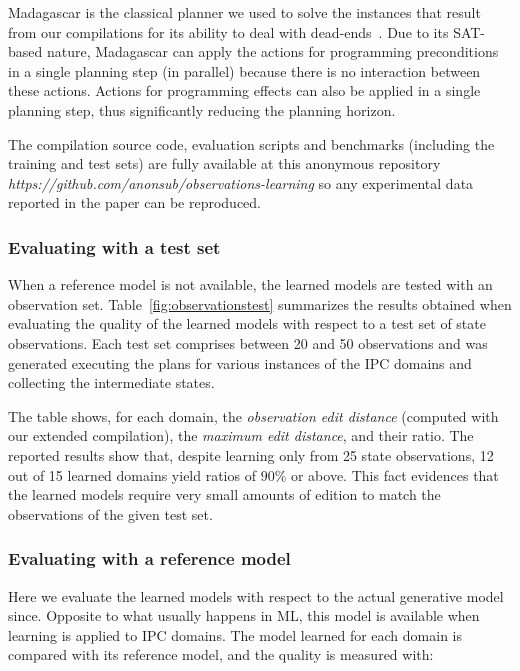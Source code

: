 \documentclass{article}
\begin{document}
{\sc Madagascar} is the classical planner we used to solve the instances that result from our compilations for its ability to deal with dead-ends~\cite{rintanen2014madagascar}. Due to its SAT-based nature, {\sc Madagascar} can apply the actions for programming preconditions in a single planning step (in parallel) because there is no interaction between these actions. Actions for programming effects can also be applied in a single planning step, thus significantly reducing the planning horizon.

The compilation source code, evaluation scripts and benchmarks (including the training and test sets) are fully available at this anonymous repository {\em https://github.com/anonsub/observations-learning} so any experimental data reported in the paper can be reproduced.


\subsubsection{Evaluating with a test set}

When a reference model is not available, the learned models are tested with an observation set. Table~\ref{fig:observationstest} summarizes the results obtained when evaluating the quality of the learned models with respect to a test set of state observations. Each test set comprises between 20 and 50 observations and was generated executing the plans for various instances of the IPC domains and collecting the intermediate states.

The table shows, for each domain, the {\em observation edit distance} (computed with our extended compilation), the {\em maximum edit distance}, and their ratio. The reported results show that, despite learning only from 25 state observations, 12 out of 15 learned domains yield ratios of $90\%$ or above. This fact evidences that the learned models require very small amounts of edition to match the observations of the given test set.


\subsubsection{Evaluating with a reference model}

Here we evaluate the learned models with respect to the actual generative model since. Opposite to what usually happens in ML, this model is available when learning is applied to IPC domains. The model learned for each domain is compared with its reference model, and the quality is measured with:
\end{document}
